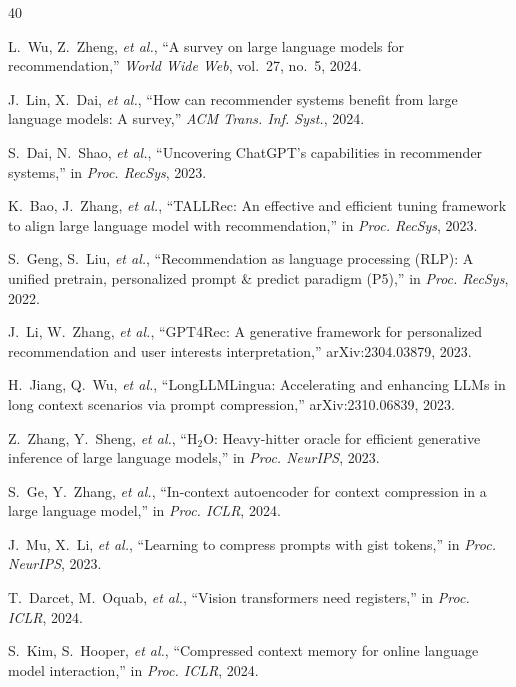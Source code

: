 \documentclass[lettersize,journal]{IEEEtran}
\begin{document}
\begin{thebibliography}{40}

L.~Wu, Z.~Zheng, \textit{et al.},
``A survey on large language models for recommendation,''
\textit{World Wide Web}, vol.~27, no.~5, 2024.

J.~Lin, X.~Dai, \textit{et al.},
``How can recommender systems benefit from large language models: A survey,''
\textit{ACM Trans. Inf. Syst.}, 2024.

S.~Dai, N.~Shao, \textit{et al.},
``Uncovering ChatGPT's capabilities in recommender systems,''
in \textit{Proc. RecSys}, 2023.

K.~Bao, J.~Zhang, \textit{et al.},
``TALLRec: An effective and efficient tuning framework to align large language
model with recommendation,''
in \textit{Proc. RecSys}, 2023.

S.~Geng, S.~Liu, \textit{et al.},
``Recommendation as language processing (RLP): A unified pretrain,
personalized prompt \& predict paradigm (P5),''
in \textit{Proc. RecSys}, 2022.

J.~Li, W.~Zhang, \textit{et al.},
``GPT4Rec: A generative framework for personalized recommendation and user
interests interpretation,''
arXiv:2304.03879, 2023.

H.~Jiang, Q.~Wu, \textit{et al.},
``LongLLMLingua: Accelerating and enhancing LLMs in long context scenarios
via prompt compression,''
arXiv:2310.06839, 2023.

Z.~Zhang, Y.~Sheng, \textit{et al.},
``H$_2$O: Heavy-hitter oracle for efficient generative inference of large
language models,''
in \textit{Proc. NeurIPS}, 2023.

S.~Ge, Y.~Zhang, \textit{et al.},
``In-context autoencoder for context compression in a large language model,''
in \textit{Proc. ICLR}, 2024.

J.~Mu, X.~Li, \textit{et al.},
``Learning to compress prompts with gist tokens,''
in \textit{Proc. NeurIPS}, 2023.

T.~Darcet, M.~Oquab, \textit{et al.},
``Vision transformers need registers,''
in \textit{Proc. ICLR}, 2024.

S.~Kim, S.~Hooper, \textit{et al.},
``Compressed context memory for online language model interaction,''
in \textit{Proc. ICLR}, 2024.


\end{thebibliography}
\end{document}

